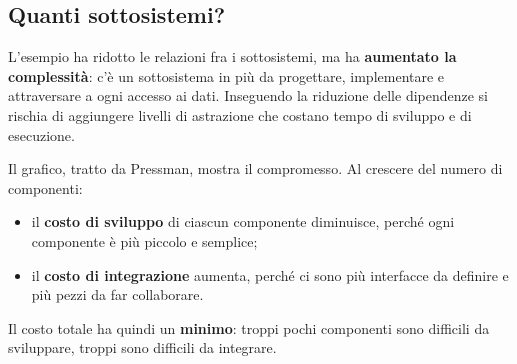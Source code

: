 \subsection{Quanti sottosistemi?}

L'esempio ha ridotto le relazioni fra i sottosistemi, ma ha \textbf{aumentato la complessità}: c'è un sottosistema in più
da progettare, implementare e attraversare a ogni accesso ai dati. Inseguendo la riduzione delle dipendenze si rischia di
aggiungere livelli di astrazione che costano tempo di sviluppo e di esecuzione.

\noindent\begin{minipage}[c]{0.44\textwidth}
Il grafico, tratto da Pressman, mostra il compromesso. Al crescere del numero di componenti:
\begin{itemize}
  \item il \textbf{costo di sviluppo} di ciascun componente diminuisce, perché ogni componente è più piccolo e semplice;
  \item il \textbf{costo di integrazione} aumenta, perché ci sono più interfacce da definire e più pezzi da far
        collaborare.
\end{itemize}
Il costo totale ha quindi un \textbf{minimo}: troppi pochi componenti sono difficili da sviluppare, troppi sono difficili
da integrare.
\end{minipage}\hfill
\begin{minipage}[c]{0.53\textwidth}
\centering
{}
\end{minipage}

